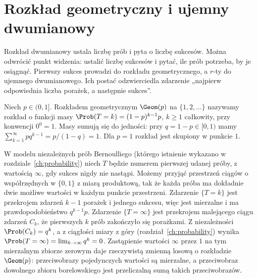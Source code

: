\section{Rozkład geometryczny i ujemny dwumianowy}
Rozkład dwumianowy ustala liczbę prób i pyta o liczbę sukcesów.
Można odwrócić punkt widzenia: ustalić liczbę sukcesów i
pytać, ile prób potrzeba, by je osiągnąć. Pierwszy sukces
prowadzi do rozkładu geometrycznego, a $r$-ty do ujemnego
dwumianowego. Ich postać odzwierciedla zdarzenie
„najpierw odpowiednia liczba porażek, a następnie sukces”.

\begin{definicja}
Niech $p\in(0,1]$. Rozkładem geometrycznym $\Geom(p)$
na $\{1,2,\ldots\}$ nazywamy rozkład o funkcji masy
$\Prob(T=k)=(1-p)^{k-1}p$, $k\geq1$ całkowity,
przy konwencji $0^0=1$.
Masy sumują się do jedności: przy $q=1-p\in[0,1)$
mamy $\sum_{k=1}^\infty pq^{k-1}=p/(1-q)=1$.
Dla $p=1$ rozkład jest skupiony w punkcie $1$.

W modelu niezależnych prób Bernoulliego (którego istnienie
wykazano w rozdziale~\ref{ch:probability}) niech $T$ będzie
numerem pierwszej udanej próby, z wartością $\infty$,
gdy sukces nigdy nie nastąpi. Możemy przyjąć przestrzeń
ciągów o współrzędnych w $\{0,1\}$ z miarą produktową,
tak że każda próba ma dokładnie dwie możliwe wartości
w każdym punkcie przestrzeni. Zdarzenie $\{T=k\}$ jest
przekrojem zdarzeń $k-1$ porażek i jednego sukcesu,
więc jest mierzalne i ma prawdopodobieństwo $q^{k-1}p$.
Zdarzenie $\{T=\infty\}$ jest przekrojem malejącego
ciągu zdarzeń $C_k$, że pierwszych $k$ prób zakończyło się
porażkami. Z niezależności $\Prob(C_k)=q^k$, a z ciągłości
miary z góry (rozdział~\ref{ch:probability}) wynika
$\Prob(T=\infty)=\lim_{k\to\infty}q^k=0$. Zastąpienie wartości $\infty$
przez $1$ na tym mierzalnym zbiorze zerowym daje rzeczywistą
zmienną losową o rozkładzie $\Geom(p)$: przeciwobrazy
pojedynczych wartości są mierzalne, a przeciwobraz
dowolnego zbioru borelowskiego jest przeliczalną sumą
takich przeciwobrazów.
\end{definicja}

